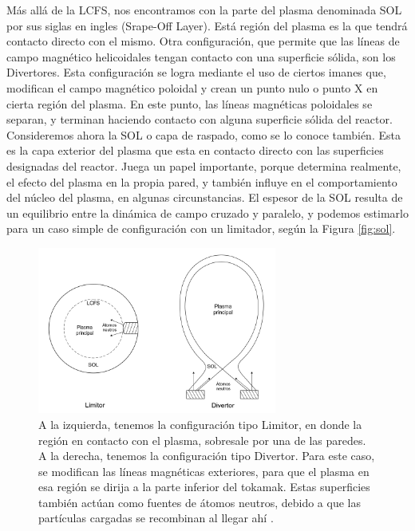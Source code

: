\documentclass[../main.tex]{subfiles}
\begin{document}
    Más allá de la LCFS, nos encontramos con la parte del plasma denominada SOL por sus siglas en ingles (Srape-Off Layer). Está región del plasma es la que tendrá contacto directo con el mismo. Otra configuración, que permite que las líneas de campo magnético helicoidales tengan contacto con una superficie sólida, son los Divertores. Esta configuración se logra mediante el uso de ciertos imanes que, modifican el campo magnético poloidal y crean un punto nulo o punto X en cierta región del plasma. En este punto, las líneas magnéticas poloidales se separan, y terminan haciendo contacto con alguna superficie sólida del reactor. Consideremos ahora la SOL o capa de raspado, como se lo conoce también. Esta es la capa exterior del plasma que esta en contacto directo con las superficies designadas del reactor. Juega un papel importante, porque determina realmente, el efecto del plasma en la propia pared, y también influye en el comportamiento del núcleo del plasma, en algunas circunstancias. El espesor de la SOL resulta de un equilibrio entre la dinámica de campo cruzado y paralelo, y podemos estimarlo para un caso simple de configuración con un limitador, según la Figura \ref{fig:sol}. \\
    
    \begin{figure}[h]
        \centering
        \includegraphics[width=0.7\textwidth]{Images/limitor_divertor.jpg}
        \caption{A la izquierda, tenemos la configuración tipo Limitor, en donde la región en contacto con el plasma, sobresale por una de las paredes. A la derecha, tenemos la configuración tipo 
        Divertor. Para este caso, se modifican las líneas magnéticas exteriores, para que el plasma en esa región se dirija a la parte inferior del tokamak. Estas superficies también actúan como fuentes de átomos neutros, debido a que las partículas cargadas se recombinan al llegar ahí \cite{stangeby2000plasma}.}
        \label{fig:lim_div}
        \end{figure}
    
\end{document}
